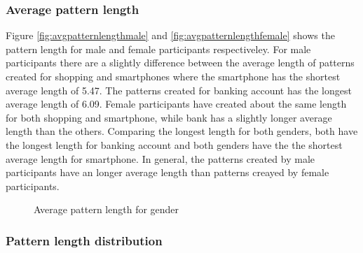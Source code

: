     \clearpage
    \subsubsection{Average pattern length}

    Figure \ref{fig:avgpatternlengthmale} and \ref{fig:avgpatternlengthfemale} shows the pattern length for male and female participants respectiveley. For male participants there are a slightly difference between the average length of patterns created for shopping and smartphones where the smartphone has the shortest average length of 5.47. The patterns created for banking account has the longest average length of 6.09. Female participants have created about the same length for both shopping and smartphone, while bank has a slightly longer average length than the others. Comparing the longest length for both genders, both have the longest length for banking account and both genders have the the shortest average length for smartphone. In general, the patterns created by male participants have an longer average length than patterns creayed by female participants. 

    \begin{figure}[H]
    	\centering
    	\caption{Average pattern length for gender}
    	\label{fig:avgpatternlengthgender}
    \end{figure}

    \subsubsection{Pattern length distribution}

